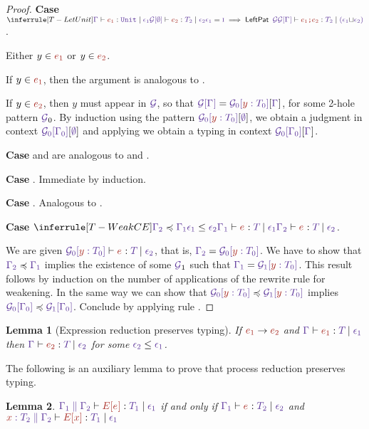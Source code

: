 \documentclass{article}
\newtheorem{lemma}{Lemma}
\begin{document}
\begin{proof}
  \textbf{Case} $\RuleTLetUnit$.

  Either $y \in \E[1]$ or $y \in \E[2]$.

  If $y \in \E[1]$, then the argument is analogous to .

  If $y \in \E[2]$, then $y$ must appear in $\CtxPatternRaw$, so
  that $\CtxPattern{\Ctx} = \CtxPattern[0]{\CtxVar y {\T[0]}}[{\Ctx}]$, for
  some 2-hole pattern $\CtxPatternRaw_0$. By induction using the
  pattern $\CtxPattern[0]{\CtxVar y {\T[0]}}[\CtxEmpty]$, we
  obtain a judgment in context $\CtxPattern[0]{\Ctx[0]}[\CtxEmpty]$
 and applying 
 we obtain a typing in context $\CtxPattern[0]{\Ctx[0]}[{\Ctx}]$.

 \textbf{Case}  and  are analogous
 to  and .

 \textbf{Case} . Immediate by induction.

 \textbf{Case} . Analogous to .

 \textbf{Case} $\RuleTWeakCE$.

 We are given   $\HasType {\CtxPattern[0]{\CtxVar y {\T[0]}}} {\E}
 {\T} {\Eff[2]}$, that is, $\Ctx[2] = \CtxPattern[0]{\CtxVar y
   {\T[0]}}$.
 We have to show that $\Ctx[2] \preccurlyeq \Ctx[1]$ implies the
 existence of some $\CtxPatternRaw_1$ such that $\Ctx[1] =
 \CtxPattern[1]{\CtxVar y {\T[0]}}$. This result follows by induction
 on the number of applications of the rewrite rule for weakening.
 In the same way we can show that
 $\CtxPattern[0]{\CtxVar y {\T[0]}}\preccurlyeq \CtxPattern[1]{\CtxVar y {\T[0]}}$
 implies
 $\CtxPattern[0]{\Ctx[0]}\preccurlyeq
 \CtxPattern[1]{\Ctx[0]}$.
 Conclude by applying rule .
\end{proof}

\begin{lemma}[Expression reduction preserves typing]
  If $\E[1] \Reduces \E[2]$ and 
  $\HasType
      {\Ctx}
      {\E[1]}
      {\T}
      {\Eff[1]}$
  then 
  $\HasType
      {\Ctx}
      {\E[2]}
      {\T}
      {\Eff[2]}$
  for some $\Eff[2] \leq \Eff[1]$.
\end{lemma}

The following is an auxiliary lemma to prove that 
process reduction preserves typing.

\begin{lemma}
    $\HasType
      {\CtxExtUnord {\Ctx[1]}{\Ctx[2]}}
      {\EC[\E]}
      {\T[1]}
      {\Eff[1]}$ 
    if and only if
    $\HasType
      {\Ctx[1]}
      {\E}
      {\T[2]}
      {\Eff[2]}$
    and 
    $\HasType
      {\CtxExtUnord {\CtxVar x{\T[2]}}{\Ctx[2]}}
      {\EC[x]}
      {\T[1]}
      {\Eff[1]}$ 
\end{lemma}
\end{document}
